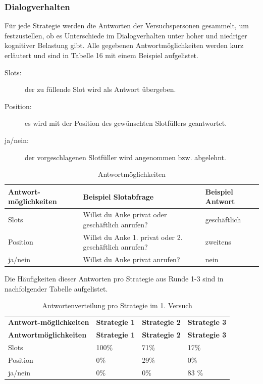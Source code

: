 \documentclass[12pt,a4paper]{scrartcl}
\begin{document}
\subsubsection{Dialogverhalten}
\label{disverh1}
Für jede Strategie werden die Antworten der Versuchspersonen gesammelt, um festzustellen, ob es Unterschiede im Dialogverhalten unter hoher und niedriger kognitiver Belastung gibt. Alle gegebenen Antwortmöglichkeiten werden kurz erläutert und sind in Tabelle 16 mit einem Beispiel aufgelistet.

\begin{description}
\item[Slots:] der zu füllende Slot wird als Antwort übergeben.
\item[Position:] es wird mit der Position des gewünschten Slotfüllers geantwortet.
\item[ja/nein:] der vorgeschlagenen Slotfüller wird angenommen bzw. abgelehnt.
\end{description}

\begin{table}[H]
\label{Dialogverhalten11}
\caption[Antwortmöglichkeiten]{Antwortmöglichkeiten}
\begin{tabular}{|p{3cm}|p{6cm}|p{3cm}|}
\hline
\textbf{Antwort-möglichkeiten}&\textbf{Beispiel \newline Slotabfrage}&\textbf{Beispiel \newline Antwort}\\ \hline \hline
Slots  & Willst du Anke privat oder geschäftlich anrufen? & geschäftlich  \\
Position & Willst du Anke 1. privat oder 2. geschäftlich anrufen? & zweitens  \\
ja/nein & Willst du Anke privat anrufen? &  nein\\ 
\hline
\end{tabular}
\end{table}


Die Häufigkeiten dieser Antworten pro Strategie aus Runde 1-3 sind in nachfolgender Tabelle aufgelistet.

\begin{longtable}{p{3cm}p{3cm}p{3cm}p{3cm} }
	\label{Dialogverhalten12}\\
	\caption[Antwortenverteilung pro Strategie im 1. Versuch]{Antwortenverteilung pro Strategie im 1. Versuch}\\
	\hline
\textbf{Antwort-möglichkeiten}&\textbf{Strategie 1}&\textbf{Strategie 2} &\textbf{Strategie 3}\\
	\hline
	\endfirsthead
	\hline
	\textbf{Antwortmöglichkeiten}&\textbf{Strategie 1}&\textbf{Strategie 2} &\textbf{Strategie 3}\\
	\hline
	\endhead
Slots & 100\% & 71\%\ & 17\%  \\
Position & 0\% & 29\% & 0\%  \\
ja/nein & 0\% & 0\%  & 83 \%  \\
\hline
\end{longtable}
\end{document}
